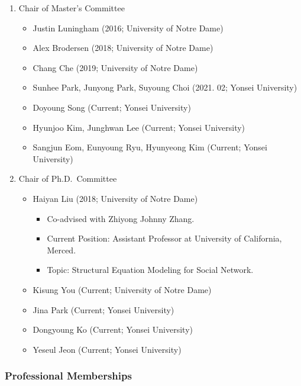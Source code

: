\documentclass[]{book}
\providecommand{\tightlist}{%
  \setlength{\itemsep}{0pt}\setlength{\parskip}{0pt}}
\begin{document}
\begin{enumerate}
\def\labelenumi{\arabic{enumi}.}
\item
  Chair of Master's Committee

  \begin{itemize}
  \tightlist
  \item
    Justin Luningham (2016; University of Notre Dame)
  \item
    Alex Brodersen (2018; University of Notre Dame)
  \item
    Chang Che (2019; University of Notre Dame)
  \item
    Sunhee Park, Junyong Park, Suyoung Choi (2021. 02; Yonsei University)
  \item
    Doyoung Song (Current; Yonsei University)
  \item
    Hyunjoo Kim, Junghwan Lee (Current; Yonsei University)
  \item
    Sangjun Eom, Eunyoung Ryu, Hyunyeong Kim (Current; Yonsei University)
  \end{itemize}
\item
  Chair of Ph.D.~Committee

  \begin{itemize}
  \tightlist
  \item
    Haiyan Liu (2018; University of Notre Dame)

    \begin{itemize}
    \tightlist
    \item
      Co-advised with Zhiyong Johnny Zhang.
    \item
      Current Position: Assistant Professor at University of California, Merced.
    \item
      Topic: Structural Equation Modeling for Social Network.
    \end{itemize}
  \item
    Kisung You (Current; University of Notre Dame)
  \item
    Jina Park (Current; Yonsei University)
  \item
    Dongyoung Ko (Current; Yonsei University)
  \item
    Yeseul Jeon (Current; Yonsei University)
  \end{itemize}
\end{enumerate}

\hypertarget{professional-memberships}{%
\subsubsection*{Professional Memberships}\label{professional-memberships}}
\end{document}
